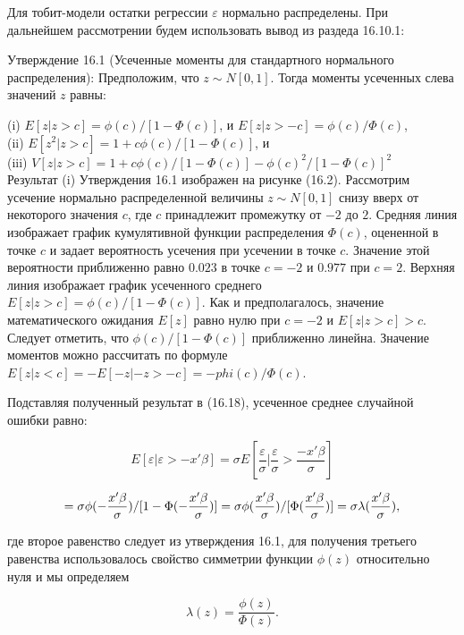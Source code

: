 Для тобит-модели остатки регрессии $\varepsilon$ нормально распределены. При дальнейшем рассмотрении будем использовать вывод из раздеда 16.10.1:

Утверждение 16.1 (Усеченные моменты для стандартного нормального распределения): Предположим, что $z{\sim}N[0,1]$. Тогда моменты усеченных слева значений $z$ равны:


(i) $E[z|z>c]=\phi(c)/[1-\Phi(c)]$, и $E[z|z>-c]=\phi(c)/\Phi(c)$,\\
 (ii) $E[z^{2}|z>c]=1+c\phi(c)/[1-\Phi(c)]$, и \\
 (iii) $V[z|z>c]=1+c\phi(c)/[1-\Phi(c)]-\phi(c)^{2}/[1-\Phi(c)]^{2}$ \\

Результат (i) Утверждения 16.1 изображен на рисунке (16.2). Рассмотрим усечение нормально распределенной величины $z{\sim}N[0,1]$ снизу вверх от некоторого значения $c$, где $c$ принадлежит промежутку от $-2$ до $2$. Средняя линия изображает график кумулятивной функции распределения $\Phi(c)$, оцененной в точке $c$ и задает вероятность усечения при усечении в точке $c$. Значение этой вероятности приближенно равно $0.023$ в точке $c=-2$ и $0.977$ при $c=2$. Верхняя линия изображает график усеченного среднего $E[z|z>c]=\phi(c)/[1-\Phi(c)]$. Как и предполагалось, значение математического ожидания $E[z]$ равно нулю при $c=-2$ и $E[z|z>c]>c$. Следует отметить, что $\phi(c)/[1-\Phi(c)]$ приближенно линейна. Значение моментов можно рассчитать по формуле $E[z|z<c]=-E[-z|-z>-c]=-phi(c)/\Phi(c)$. 

Подставляя полученный результат в (16.18), усеченное среднее случайной ошибки равно:

\begin{equation}
E[\varepsilon|\varepsilon>{-x}'\beta]={\sigma}E[\dfrac{\varepsilon}{\sigma}|\dfrac{\varepsilon}{\sigma}>\dfrac{{-x}'\beta}{\sigma}]  
\end{equation}

\[
=\sigma\phi(-\dfrac{x'\beta}{\sigma})/[1-\Phi(-\dfrac{x'\beta}{\sigma})] \\
=\sigma\phi(\dfrac{x'\beta}{\sigma})/[\Phi(\dfrac{x'\beta}{\sigma})] \\
=\sigma\lambda(\dfrac{x'\beta}{\sigma}),
\]

где второе равенство следует из утверждения 16.1, для получения третьего равенства использовалось свойство симметрии функции $\phi(z)$ относительно нуля и мы определяем 

\begin{equation}
\lambda(z)=\dfrac{\phi(z)}{\Phi(z)}.
\end{equation}

